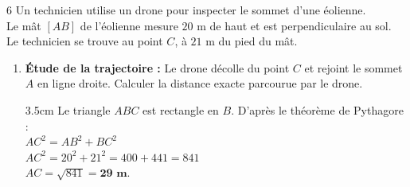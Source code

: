 \documentclass[a4paper]{book}
\begin{document}
{    \begin{exerciceNote}{6}
        Un technicien utilise un drone pour inspecter le sommet d'une éolienne. \\
        Le mât $[AB]$ de l'éolienne mesure $20\text{ m}$ de haut et est perpendiculaire au sol. \\
        Le technicien se trouve au point $C$, à $21\text{ m}$ du pied du mât.

        \begin{center}
        \end{center}
        
        \begin{enumerate}[leftmargin=*]
            \item \textbf{Étude de la trajectoire :} Le drone décolle du point $C$ et rejoint le sommet $A$ en ligne droite. Calculer la distance exacte parcourue par le drone.

            \begin{ZoneReponse}{3.5cm}                
            Le triangle $ABC$ est rectangle en $B$. D'après le théorème de Pythagore : \\
            $AC^2 = AB^2 + BC^2$ \\
            $AC^2 = 20^2 + 21^2 = 400 + 441 = 841$ \\
            $AC = \sqrt{841} = \mathbf{29 \text{ m}}$.
            \end{ZoneReponse}


\end{enumerate}
\end{exerciceNote}}
\end{document}
